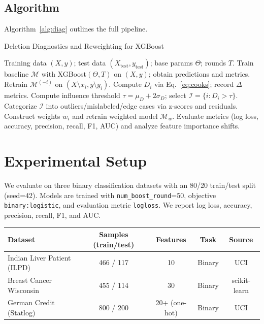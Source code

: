 \documentclass[sn-basic]{sn-jnl} %
\begin{document}
\subsection{Algorithm}
Algorithm~\ref{alg:diag} outlines the full pipeline.

\begin{algorithm}[H]
\caption{Deletion Diagnostics and Reweighting for XGBoost}
\label{alg:diag}
\begin{algorithmic}[1]
\Require Training data $(X, y)$; test data $(X_{\text{test}}, y_{\text{test}})$; base params $\Theta$; rounds $T$.
\State Train baseline $\mathcal{M}$ with XGBoost$(\Theta, T)$ on $(X,y)$; obtain predictions and metrics.
  \State Retrain $\mathcal{M}^{(-i)}$ on $(X\setminus x_i, y\setminus y_i)$.
  \State Compute $D_i$ via Eq.~\eqref{eq:cooks}; record $\Delta$metrics.
\EndFor
\State Compute influence threshold $\tau=\mu_D+2\sigma_D$; select $\mathcal{I}=\{i: D_i>\tau\}$.
\State Categorize $\mathcal{I}$ into outliers/mislabeled/edge cases via z-scores and residuals.
\State Construct weights $w_i$ and retrain weighted model $\mathcal{M}_w$.
\State Evaluate metrics (log loss, accuracy, precision, recall, F1, AUC) and analyze feature importance shifts.
\end{algorithmic}
\end{algorithm}

\section{Experimental Setup}
We evaluate on three binary classification datasets with an 80/20 train/test split (seed=42). Models are trained with \texttt{num\_boost\_round}=50, objective \texttt{binary:logistic}, and evaluation metric \texttt{logloss}. We report log loss, accuracy, precision, recall, F1, and AUC.

\begin{center}
\label{tab:datasets}
\begin{tabular}{lcccc}
\toprule
Dataset & Samples (train/test) & Features & Task & Source \\
\midrule
Indian Liver Patient (ILPD) & 466 / 117 & 10 & Binary & UCI \\
Breast Cancer Wisconsin     & 455 / 114 & 30 & Binary & scikit-learn \\
German Credit (Statlog)     & 800 / 200 & 20+ (one-hot) & Binary & UCI \\
\bottomrule
\end{tabular}
\end{center}
\end{document}
